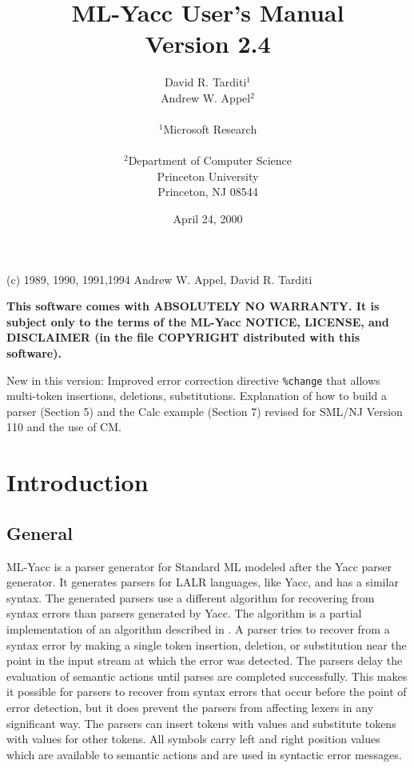 \title{                        ML-Yacc User's Manual \\
			       Version 2.4
      }
\author{                David R. Tarditi$^1$\\
                        Andrew W. Appel$^2$\\
\\              
$^1$Microsoft Research \\
\\
$^2$Department of Computer Science \\
    Princeton University \\
    Princeton, NJ 08544 
}
\date{April 24, 2000}


\maketitle
\begin{center}
(c) 1989, 1990, 1991,1994 Andrew W. Appel, David R. Tarditi
\end{center}

{\bf
This software comes with ABSOLUTELY NO WARRANTY.  It is subject only to
the terms of the ML-Yacc NOTICE, LICENSE, and DISCLAIMER (in the
file COPYRIGHT distributed with this software).
}

New in this version:  Improved error correction directive \verb|%change|
that allows multi-token insertions, deletions, substitutions.
Explanation of how to build a parser (Section 5) and the Calc example
(Section 7) revised for SML/NJ Version 110 and the use of CM.

\newpage
\tableofcontents
\newpage

\section{Introduction}
\subsection{General}
ML-Yacc is a parser generator for Standard ML modeled after the
Yacc parser generator.  It generates parsers for LALR languages, like Yacc,
and has a similar syntax.  The generated parsers use a different algorithm 
for recovering from syntax errors than parsers generated by Yacc.  
The algorithm is a partial implementation of an algorithm described in \cite{bf}.
A parser tries to recover from a syntax error
by making a single token insertion, deletion, or
substitution near the point in the input stream at which the error
was detected.  The parsers delay the evaluation of semantic actions until
parses are completed successfully.  This makes it possible for
parsers to recover from syntax errors that occur before the point
of error detection, but it does prevent the parsers from
affecting lexers in any significant way.  The parsers
can insert tokens with values and substitute tokens with values
for other tokens. All symbols carry left and right position values
which are available to semantic actions and are used in
syntactic error messages.


